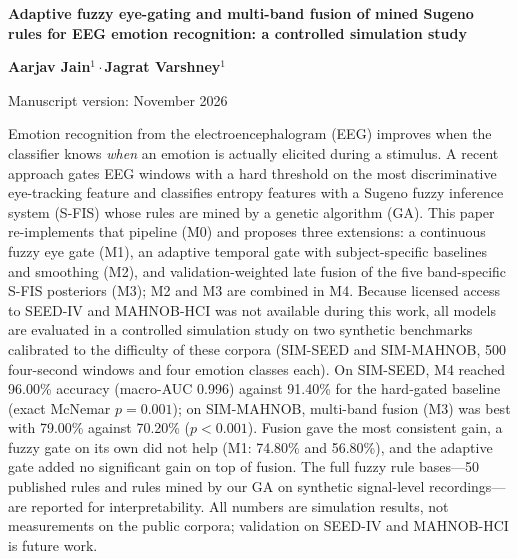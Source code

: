 \documentclass[10pt,twoside]{article}
\newcommand{\simseed}{SIM-SEED}
\newcommand{\simmah}{SIM-MAHNOB}
\newcommand{\kw}{\,$\cdot$\,}
\begin{document}
\thispagestyle{first}

{\raggedright
{\sffamily\bfseries\fontsize{15.5}{19}\selectfont Adaptive fuzzy eye-gating and multi-band fusion of mined Sugeno rules for EEG emotion recognition: a controlled simulation study\par}
\vspace{10pt}
{\sffamily\bfseries\normalsize Aarjav Jain$^{1}$\kw Jagrat Varshney$^{1}$\par}
\vspace{6pt}
{\footnotesize Manuscript version: November 2026\par}
}
\vspace{14pt}

\par\vspace{3pt}
\noindent Emotion recognition from the electroencephalogram (EEG) improves when the classifier knows \emph{when} an emotion is actually elicited during a stimulus. A recent approach gates EEG windows with a hard threshold on the most discriminative eye-tracking feature and classifies entropy features with a Sugeno fuzzy inference system (S-FIS) whose rules are mined by a genetic algorithm (GA). This paper re-implements that pipeline (M0) and proposes three extensions: a continuous fuzzy eye gate (M1), an adaptive temporal gate with subject-specific baselines and smoothing (M2), and validation-weighted late fusion of the five band-specific S-FIS posteriors (M3); M2 and M3 are combined in M4. Because licensed access to SEED-IV and MAHNOB-HCI was not available during this work, all models are evaluated in a controlled simulation study on two synthetic benchmarks calibrated to the difficulty of these corpora (\simseed{} and \simmah{}, 500 four-second windows and four emotion classes each). On \simseed{}, M4 reached 96.00\% accuracy (macro-AUC 0.996) against 91.40\% for the hard-gated baseline (exact McNemar $p=0.001$); on \simmah{}, multi-band fusion (M3) was best with 79.00\% against 70.20\% ($p<0.001$). Fusion gave the most consistent gain, a fuzzy gate on its own did not help (M1: 74.80\% and 56.80\%), and the adaptive gate added no significant gain on top of fusion. The full fuzzy rule bases---50 published rules and rules mined by our GA on synthetic signal-level recordings---are reported for interpretability. All numbers are simulation results, not measurements on the public corpora; validation on SEED-IV and MAHNOB-HCI is future work.
\end{document}
